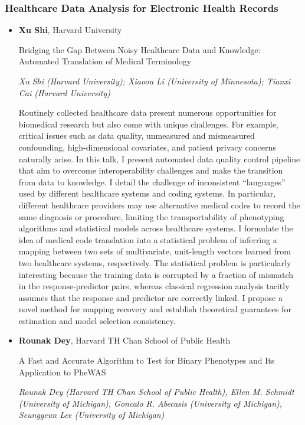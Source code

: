 \subsubsection*{Healthcare Data Analysis for Electronic Health Records}

\begin{itemize}
\item \textbf{Xu Shi}, Harvard University

Bridging the Gap Between Noisy Healthcare Data and Knowledge: Automated Translation of Medical Terminology

\emph{\footnotesize Xu Shi (Harvard University); Xiaoou Li (University of Minnesota); Tianxi Cai (Harvard University)}

Routinely collected healthcare data present numerous opportunities for biomedical research but also come with unique challenges. For example, critical issues such as data quality, unmeasured and mismeasured confounding, high-dimensional covariates, and patient privacy concerns naturally arise. In this talk, I present automated data quality control pipeline that aim to overcome interoperability challenges and make the transition from data to knowledge. I detail the challenge of inconsistent “languages” used by different healthcare systems and coding systems. In particular, different healthcare providers may use alternative medical codes to record the same diagnosis or procedure, limiting the transportability of phenotyping algorithms and statistical models across healthcare systems. I formulate the idea of medical code translation into a statistical problem of inferring a mapping between two sets of multivariate, unit-length vectors learned from two healthcare systems, respectively. The statistical problem is particularly interesting because the training data is corrupted by a fraction of mismatch in the response-predictor pairs, whereas classical regression analysis tacitly assumes that the response and predictor are correctly linked. I propose a novel method for mapping recovery and establish theoretical guarantees for estimation and model selection consistency.

\item \textbf{Rounak Dey}, Harvard TH Chan School of Public Health

A Fast and Accurate Algorithm to Test for Binary Phenotypes and Its Application to PheWAS

\emph{\footnotesize Rounak Dey (Harvard TH Chan School of Public Health), Ellen M. Schmidt (University of Michigan), Goncalo R. Abecasis (University of Michigan), Seunggeun Lee (University of Michigan)}


\end{itemize}
